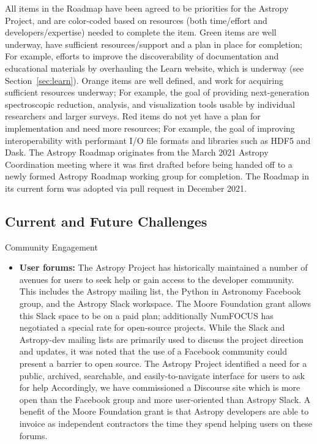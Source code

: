 \documentclass[modern]{aastex631}
\begin{document}
All items in the Roadmap have been agreed to be priorities for the Astropy
Project, and are color-coded based on resources (both time/effort and
developers/expertise) needed to complete the item. Green items are well
underway, have sufficient resources/support and a plan in place for completion;
For example, efforts to improve the discoverability of documentation and
educational materials by overhauling the Learn website, which is underway (see
Section~\ref{sec:learn}).
Orange items are well defined, and work for acquiring sufficient resources
underway; For example, the goal of providing next-generation spectroscopic
reduction, analysis, and visualization tools usable by individual researchers
and larger surveys.
Red items do not yet have a plan for implementation and need more resources; For
example, the goal of improving interoperability with performant I/O file formats
and libraries such as HDF5 and Dask.
The Astropy Roadmap originates from the March 2021 Astropy Coordination meeting
where it was first drafted before being handed off to a newly formed Astropy
Roadmap working group for completion. The Roadmap in its current form was
adopted via pull request in December 2021.


\subsection{Current and Future Challenges}

Community Engagement

\begin{itemize}
\item {\bf User forums:} The Astropy Project has historically maintained a number of avenues for users to seek help or gain access to the developer community. This includes the Astropy mailing list, the Python in Astronomy Facebook group, and the Astropy Slack workspace. The Moore Foundation grant allows this Slack space to
be on a paid plan; additionally NumFOCUS has negotiated a special rate for
open-source projects. While the Slack and Astropy-dev mailing lists are primarily used to discuss the project direction and updates, it was noted that the use of a Facebook community could present a barrier to open source. The Astropy Project identified a need for a public, archived, searchable, and easily-to-navigate interface for users to ask for help Accordingly, we have commissioned
a Discourse site which is more open than the Facebook group and more user-oriented
than Astropy Slack. A benefit of the Moore Foundation grant is that Astropy
developers are able to invoice as independent contractors the time they
spend helping users on these forums.
\end{itemize}
\end{document}
